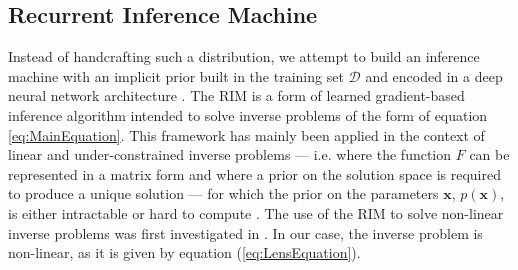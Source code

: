


\subsection{Recurrent Inference Machine}\label{sec:rim}

Instead of handcrafting such a distribution, we 
attempt to build an inference machine with
an implicit prior built in the training set $\mathcal{D}$ and 
encoded in a deep neural network architecture \citep{Bengio2009}. 
The RIM \citep{Putzky2017} is a form of learned 
gradient-based inference algorithm intended to solve inverse problems of the form 
of equation \eqref{eq:MainEquation}. This framework has mainly been applied in the context of linear and under-constrained inverse problems --- i.e. where the function $F$ can be represented in a matrix form and where a prior on the solution space is required to produce a unique solution --- for which the prior on the parameters $\mathbf{x}$, $p(\mathbf{x})$, is 
either intractable or hard to compute \citep{Morningstar2018,Morningstar2019,Lonning2019}. 
The use of the RIM to solve non-linear inverse problems was first investigated in \citep{Modi2021}.
In our case, the inverse problem is non-linear, as it is given by equation (\ref{eq:LensEquation}).



